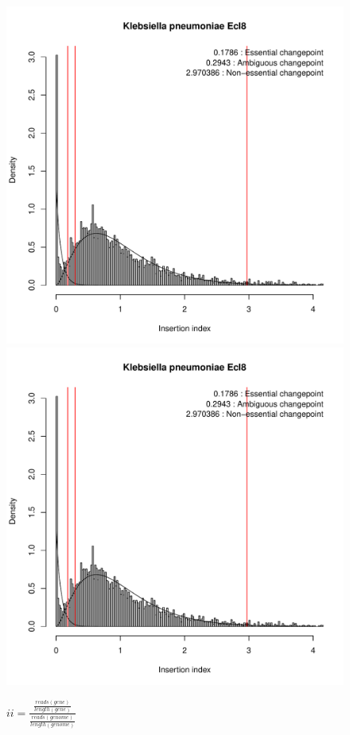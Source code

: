 \documentclass[a4paper,10pt]{article}
\begin{document}
\begin{figure}
\includegraphics[scale=0.2, page=11]{lars-reads.pdf}
\includegraphics[scale=0.2, page=12]{lars-reads.pdf}
\caption{$ii=\frac{\frac{reads(gene)}{length(gene)}}{\frac{reads(genome)}{length(genome)}}$\newline
}
\end{figure}
\end{document}
